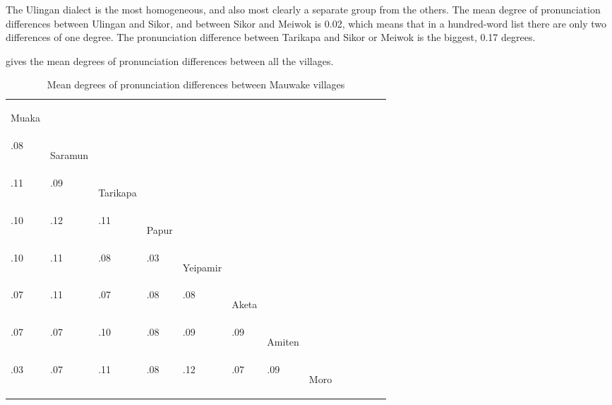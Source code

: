The Ulingan dialect is the most homogeneous, and also most clearly a separate group from the others. The mean degree of pronunciation differences between Ulingan and Sikor, and between Sikor and Meiwok is 0.02, which means that in a hundred-word list there are only two differences of one degree.  The pronunciation difference between Tarikapa and Sikor or Meiwok is the biggest, 0.17 degrees.

 gives the mean degrees of pronunciation differences between all the villages.


\begin{table}
\caption{Mean degrees of pronunciation differences between Mauwake villages}
\label{tab:1:pronunciationdiff}
\begin{tabularx}{\textwidth}{lllllllllllll}

\mytoprule  
\begin{rotate}{0}{Muaka}\end{rotate}\\ 
.08 & \begin{rotate}{0}{Saramun}\end{rotate} &  &  &  &  &  &  &  &  &  &  &  \\

.11 & .09 & \begin{rotate}{0}{Tarikapa}\end{rotate}  &  &  &  &  &  &  &  &  &  &\\

.10 & .12 & .11 & \begin{rotate}{0}{Papur}\end{rotate} &  &  &  &  &  &  &  &  &\\

.10 & .11 & .08 & .03 & \begin{rotate}{0}{Yeipamir}\end{rotate} &  &  &  &  &  &  &  &\\

.07 & .11 & .07 & .08 & .08 & \begin{rotate}{0}{Aketa}\end{rotate} &  &  &  &  &  &  &\\

.07 & .07 & .10 & .08 & .09 & .09 & \begin{rotate}{0}{Amiten}\end{rotate} &  &  &  &  &  &\\

.03 & .07 & .11 & .08 & .12 & .07 & .09 & \begin{rotate}{0}{Moro}\end{rotate} &  &  &  &  &\\


\end{tabularx}
\end{table}

